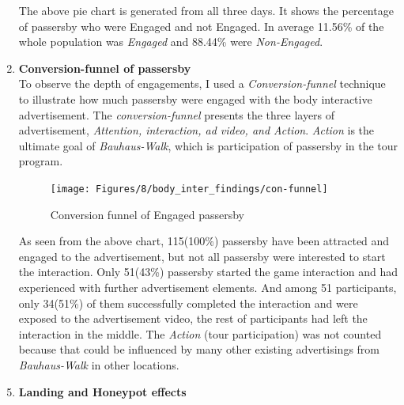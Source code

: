 \begin{enumerate}
The above pie chart is generated from all three days. It shows the percentage of passersby who were Engaged and not Engaged. In average 11.56\% of the whole population was \emph{Engaged} and 88.44\% were \emph{Non-Engaged}.




\item \textbf{Conversion-funnel of passersby} \\
To observe the depth of engagements, I used a \emph{Conversion-funnel} \cite{convfunnel} technique to illustrate how much passersby were engaged with the body interactive advertisement. The \emph{conversion-funnel} presents the three layers of advertisement, \emph{Attention, interaction, ad video, and Action}. \emph{Action} is the ultimate goal of \emph{Bauhaus-Walk}, which is participation of passersby in the tour program. 

\begin{figure}[H]
    \centering
    \texttt{[image: Figures/8/body\_inter\_findings/con-funnel]}
    \caption{Conversion funnel of Engaged passersby}%
    \label{fig:bodyengagedpasserbypercentage}%
\end{figure}

As seen from the above chart, 115(100\%) passersby have been attracted and engaged to the advertisement, but not all passersby were interested to start the interaction. Only 51(43\%) passersby started the game interaction and had experienced with further advertisement elements. And among 51 participants, only 34(51\%) of them successfully completed the interaction and were exposed to the advertisement video, the rest of participants had left the interaction in the middle. The \emph{Action} (tour participation) was not counted because that could be influenced by many other existing advertisings from \emph{Bauhaus-Walk} in other locations.



\end{enumerate}


\newpage
\begin{enumerate}
\setcounter{enumi}{4}
\item \textbf{Landing and Honeypot effects}
\end{enumerate}

